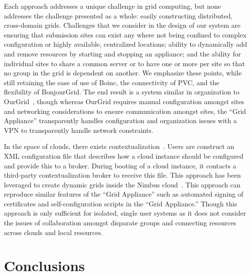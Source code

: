\documentclass[conference]{IEEEtran}
\begin{document}
Each approach addresses a unique challenge in grid computing, but none
addresses the challenge presented as a whole: easily constructing distributed,
cross-domain grids.  Challenges that we consider in the design of our system
are ensuring that submission sites can exist any where not being confined to
complex configuration or highly available, centralized locations; ability to
dynamically add and remove resources by starting and stopping an appliance; and
the ability for individual sites to share a common server or to have one or
more per site so that no group in the grid is dependent on another.  We
emphasize these points, while still retaining the ease of use of Boinc, the
connectivity of PVC, and the flexibility of BonjourGrid.  The end result is a
system similar in organization to OurGrid~\cite{ourgrid}, though whereas OurGrid
requires manual configuration amongst sites and networking considerations to
ensure communication amongst sites, the ``Grid Appliance'' transparently handles
configuration and organization issues with a VPN to transparently handle network
constraints.

In the space of clouds, there exists contextualization~\cite{context}.  Users
are construct an XML configuration file that describes how a cloud instance
should be configured and provide this to a broker.  During booting of a cloud
instance, it contacts a third-party contextualization broker to receive this
file.  This approach has been leveraged to create dynamic grids inside the
Nimbus cloud~\cite{alien_grid}.  This approach can reproduce similar features
of the ``Grid Appliance'' such as automated signing of certificates and
self-configuration scripts in the ``Grid Appliance.'' Though this approach is
only sufficient for isolated, single user systems as it does not consider the
issues of collaboration amongst disparate groups and connecting resources
across clouds and local resources.

\section{Conclusions}
\label{conclusions}
\end{document}

